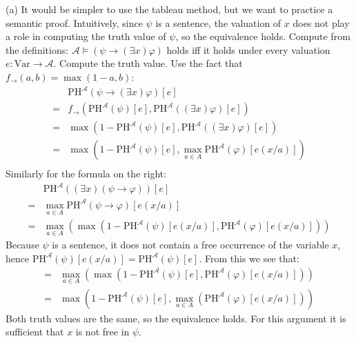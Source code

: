 \begin{problem}
\begin{solution}
        (a) It would be simpler to use the tableau method, but we want to practice a semantic proof. Intuitively, since $\psi$ is a sentence, the valuation of $x$ does not play a role in computing the truth value of $\psi$, so the equivalence holds. Compute from the definitions: $\mathcal{A}\models (\psi \to (\exists x)\varphi)$ holds iff it holds under every valuation $e:\mathrm{Var}\to\mathcal A$. Compute the truth value. Use the fact that $f_\to(a,b)=\max(1-a,b)$:
            \begin{align*}
                &\mathrm{PH}^\mathcal A(\psi \to (\exists x)\varphi)[e]\\
                =&f_\to(\mathrm{PH}^\mathcal A(\psi)[e], \mathrm{PH}^\mathcal A((\exists x)\varphi)[e])\\
                =&\max(1-\mathrm{PH}^\mathcal A(\psi)[e], \mathrm{PH}^\mathcal A((\exists x)\varphi)[e])\\
                =&\max(1-\mathrm{PH}^\mathcal A(\psi)[e], \max_{a\in A}\mathrm{PH}^\mathcal A(\varphi)[e(x/a)])\\                
            \end{align*}
            Similarly for the formula on the right:
            \begin{align*}
                &\mathrm{PH}^\mathcal A((\exists x)(\psi \to \varphi))[e]\\
                =&\max_{a\in A}\mathrm{PH}^\mathcal A(\psi \to \varphi)[e(x/a)]\\
                =&\max_{a\in A}(\max(1-\mathrm{PH}^\mathcal A(\psi)[e(x/a)], \mathrm{PH}^\mathcal A(\varphi)[e(x/a)]))
            \end{align*}
            Because $\psi$ is a sentence, it does not contain a free occurrence of the variable $x$, hence $\mathrm{PH}^\mathcal A(\psi)[e(x/a)]=\mathrm{PH}^\mathcal A(\psi)[e]$. From this we see that:
            \begin{align*}
                =&\max_{a\in A}(\max(1-\mathrm{PH}^\mathcal A(\psi)[e], \mathrm{PH}^\mathcal A(\varphi)[e(x/a)]))\\
                =&\max(1-\mathrm{PH}^\mathcal A(\psi)[e], \max_{a\in A}(\mathrm{PH}^\mathcal A(\varphi)[e(x/a)]))
            \end{align*}
            Both truth values are the same, so the equivalence holds. For this argument it is sufficient that $x$ is not free in $\psi$. 
            

\end{solution}
\end{problem}

